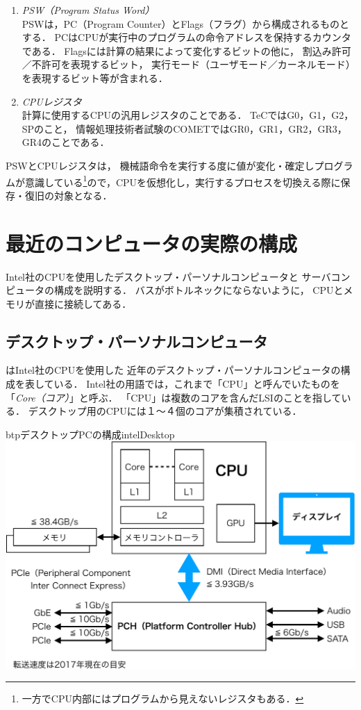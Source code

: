 \begin{enumerate}
\item \emph{PSW（Program Status Word）} \\
  PSWは，PC（Program Counter）とFlags（フラグ）から構成されるものとする．
  PCはCPUが実行中のプログラムの命令アドレスを保持するカウンタである．
  Flagsには計算の結果によって変化するビットの他に，
  割込み許可／不許可を表現するビット，
  実行モード（ユーザモード／カーネルモード）を表現するビット等が含まれる．
\item \emph{CPUレジスタ} \\
  計算に使用するCPUの汎用レジスタのことである．
  TeCではG0，G1，G2，SPのこと，
  情報処理技術者試験のCOMETではGR0，GR1，GR2，GR3，GR4のことである．
\end{enumerate}

PSWとCPUレジスタは，
機械語命令を実行する度に値が変化・確定しプログラムが意識している\footnote{
  一方でCPU内部にはプログラムから見えないレジスタもある．
}ので，CPUを仮想化し，実行するプロセスを切換える際に保存・復旧の対象となる．

\section{最近のコンピュータの実際の構成}
Intel社のCPUを使用したデスクトップ・パーソナルコンピュータと
サーバコンピュータの構成を説明する．
バスがボトルネックにならないように，
CPUとメモリが直接に接続してある．

\subsection{デスクトップ・パーソナルコンピュータ}
はIntel社のCPUを使用した
近年のデスクトップ・パーソナルコンピュータの構成を表している．
Intel社の用語では，これまで「CPU」と呼んでいたものを
「\emph{Core（コア）}」と呼ぶ．
「CPU」は複数のコアを含んだLSIのことを指している．
デスクトップ用のCPUには１〜４個のコアが集積されている．

\begin{myfig}{btp}{デスクトップPCの構成}{intelDesktop}
  \includegraphics[scale=0.66]{Fig/intelDesktop-crop.pdf}
\end{myfig}

